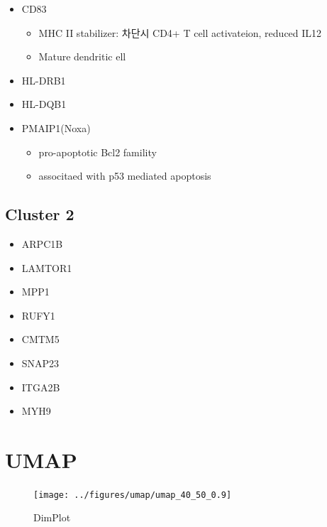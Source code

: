 \documentclass[
  12pt,
]{article}
\providecommand{\tightlist}{%
  \setlength{\itemsep}{0pt}\setlength{\parskip}{0pt}}
\begin{document}
\begin{itemize}
\tightlist
\item
  CD83

  \begin{itemize}
  \tightlist
  \item
    MHC II stabilizer: 차단시 CD4+ T cell activateion, reduced IL12
  \item
    Mature dendritic ell
  \end{itemize}
\item
  HL-DRB1
\item
  HL-DQB1
\item
  PMAIP1(Noxa)

  \begin{itemize}
  \tightlist
  \item
    pro-apoptotic Bcl2 famility
  \item
    associtaed with p53 mediated apoptosis
  \end{itemize}
\end{itemize}

\hypertarget{cluster-2}{%
\subsection{Cluster 2}\label{cluster-2}}

\begin{itemize}
\tightlist
\item
  ARPC1B
\item
  LAMTOR1
\item
  MPP1
\item
  RUFY1
\item
  CMTM5
\item
  SNAP23
\item
  ITGA2B
\item
  MYH9
\end{itemize}

\hypertarget{umap}{%
\section{UMAP}\label{umap}}

\begin{figure}

{\centering \texttt{[image: ../figures/umap/umap\_40\_50\_0.9]} 

}

\caption{DimPlot}\label{fig:singlecell-all-umap}
\end{figure}
\end{document}

